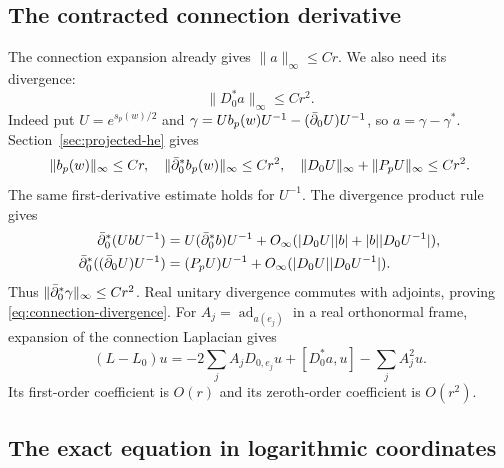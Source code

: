 \subsection{The contracted connection derivative}

The connection expansion already gives $\|a\|_\infty\le Cr$.
We also need its divergence:
\begin{equation}\label{eq:connection-divergence}
                         \|D_0^*a\|_\infty\le Cr^2.
\end{equation}
Indeed put $U=e^{s_p(w)/2}$ and
$\gamma=Ub_p(w)U^{-1}-(\bar\partial_0U)U^{-1}$, so $a=\gamma-\gamma^*$.
Section~\ref{sec:projected-he} gives
\[
 \|b_p(w)\|_\infty\le Cr,\quad
 \|\bar\partial_0^*b_p(w)\|_\infty\le Cr^2,
 \quad \|D_0U\|_\infty+\|P_pU\|_\infty\le Cr^2.
\]
The same first-derivative estimate holds for $U^{-1}$.
The divergence product rule gives
\[
 \begin{split}
 \bar\partial_0^*(UbU^{-1})
 &=U(\bar\partial_0^*b)U^{-1}
                  +O_\infty(|D_0U||b|+|b||D_0U^{-1}|),\\
 \bar\partial_0^*((\bar\partial_0U)U^{-1})
 &=(P_pU)U^{-1}+O_\infty(|D_0U||D_0U^{-1}|).
 \end{split}
\]
Thus $\|\bar\partial_0^*\gamma\|_\infty\le Cr^2$.
Real unitary divergence commutes with adjoints, proving
\eqref{eq:connection-divergence}.
For $A_j=\operatorname{ad}_{a(e_j)}$ in a real orthonormal
frame, expansion of the connection Laplacian gives
\begin{equation}\label{eq:rough-operator-perturbation}
 (L-L_0)u=-2\sum_j A_jD_{0,e_j}u+[D_0^*a,u]-\sum_jA_j^2u.
\end{equation}
Its first-order coefficient is $O(r)$ and its zeroth-order
coefficient is $O(r^2)$.

\subsection{The exact equation in logarithmic coordinates}

